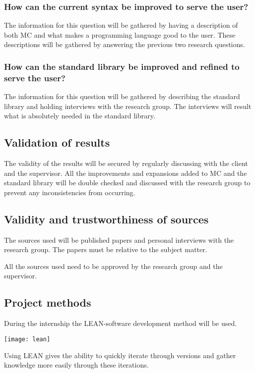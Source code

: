 \subsubsection{How can the current syntax be improved to serve the user?}
The information for this question will be gathered by having a description of both MC and what makes a programming language good to the user.
These descriptions will be gathered by answering the previous two research questions.

\subsubsection{How can the standard library be improved and refined to serve the user?}
The information for this question will be gathered by describing the standard library and holding interviews with the research group.
The interviews will result what is absolutely needed in the standard library.


\subsection{Validation of results}
The validity of the results will be secured by regularly discussing with the client and the supervisor.
All the improvements and expansions added to MC and the standard library will be double checked and discussed with the research group to prevent any inconsistencies from occurring.


\subsection{Validity and trustworthiness of sources}
The sources used will be published papers and personal interviews with the research group.
The papers must be relative to the subject matter.

All the sources used need to be approved by the research group and the supervisor.


\subsection{Project methods}
During the internship the LEAN-software development method will be used\cite{ries2011lean}.

\texttt{[image: lean]}

Using LEAN gives the ability to quickly iterate through versions and gather knowledge more easily through these iterations.

